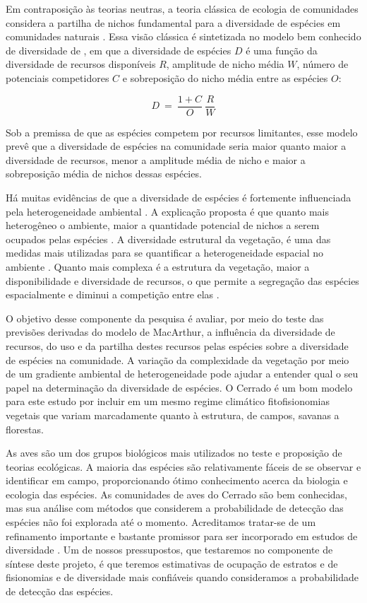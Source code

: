 \documentclass[12pt, A4]{article}
\begin{document}
Em contraposição às teorias neutras, a teoria clássica de ecologia de
comunidades considera a partilha de nichos fundamental para a
diversidade de espécies em comunidades naturais 
\citep{diamond1978,tilman1982,chase2003}. 
Essa visão clássica é
sintetizada no modelo bem conhecido de diversidade de
\citet{MacArthur1972}, em que a diversidade de espécies $D$ é uma função da diversidade de
recursos disponíveis $R$, amplitude de nicho média $W$, número de
potenciais competidores $C$ e sobreposição do nicho média entre as
espécies $O$: 

\begin{displaymath}
  D \ = \  \frac{1+C}{O} \ \frac{R}{W}
\end{displaymath}

Sob a premissa de que as espécies competem por recursos
limitantes, esse modelo prevê que a diversidade de espécies na
comunidade seria maior quanto maior a diversidade de recursos, menor a
amplitude média de nicho e maior a sobreposição média de nichos dessas
espécies.  

Há muitas evidências de que a diversidade de espécies é
fortemente influenciada pela heterogeneidade ambiental 
\citep{cody1985,rosenzweig1995,hurlbert2003}. 
A explicação proposta é
que quanto mais heterogêneo o ambiente, maior a quantidade potencial
de nichos a serem ocupados pelas espécies 
\citep{hurlbert2004,diaz2006}. A diversidade estrutural da vegetação, é uma das medidas mais
utilizadas para se quantificar a heterogeneidade espacial no ambiente
\citep{tews2004}. Quanto mais complexa é a estrutura da vegetação,
maior a disponibilidade e diversidade de recursos, o que permite a
segregação das espécies espacialmente e diminui a competição entre
elas \citep{macarthur1958}.

O objetivo desse componente da pesquisa é avaliar, por meio do teste
das previsões derivadas do modelo de MacArthur, a influência da
diversidade de recursos, do uso e da partilha destes recursos pelas
espécies sobre a diversidade de espécies na comunidade. A variação da
complexidade da vegetação por meio de um gradiente ambiental de
heterogeneidade pode ajudar a entender qual o seu papel na
determinação da diversidade de espécies. O Cerrado é um bom modelo
para este estudo por incluir em um mesmo regime climático 
fitofisionomias vegetais que variam
marcadamente quanto à estrutura, de campos, savanas a
florestas.  

As aves são um dos grupos biológicos mais utilizados no teste e
proposição de teorias ecológicas. A maioria das espécies 
são relativamente fáceis de se observar e identificar em
campo, proporcionando ótimo conhecimento
acerca da biologia e ecologia das espécies. As comunidades de aves do
Cerrado são bem conhecidas, mas sua análise com
métodos que considerem a probabilidade de detecção das espécies não
foi explorada até o momento. Acreditamos tratar-se de um refinamento
importante e bastante promissor para ser incorporado em estudos de
diversidade \citep{gu2004}. Um de nossos pressupostos, que
testaremos no componente de síntese deste projeto, é que teremos estimativas
de ocupação de estratos e de fisionomias e de diversidade mais
confiáveis quando consideramos a probabilidade de detecção das
espécies.
\end{document}
